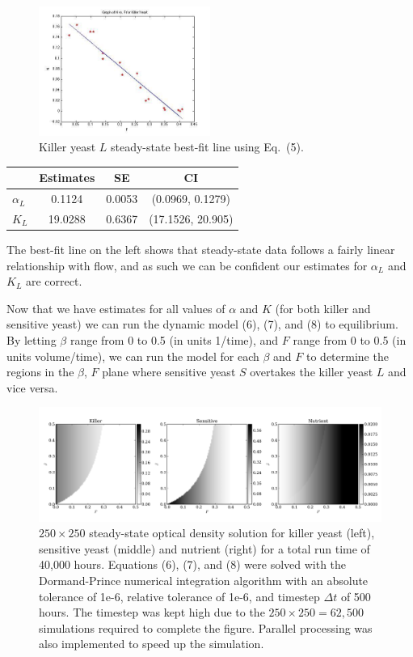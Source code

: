 \begin{multicols}{2}
\begin{figure}[H]
  \centering
    \includegraphics[width=0.5\textwidth]{images/killerFit.jpg}
  \caption{\footnotesize Killer yeast $L$ steady-state best-fit line using Eq.\ (5).}
\end{figure}
\begin{center}
\begin{tabular}{l | c c c}
  & Estimates & SE & CI \\ 
  \hline
  $\alpha_L$ & 0.1124  & 0.0053 & (0.0969,  0.1279) \\
  $K_L$      & 19.0288 & 0.6367 & (17.1526, 20.905) \\
\end{tabular}
\end{center}
The best-fit line on the left shows that steady-state data follows a fairly linear relationship with flow, and as such we can be confident our estimates for $\alpha_L$ and $K_L$ are correct.
\end{multicols}

Now that we have estimates for all values of $\alpha$ and $K$ (for both killer and sensitive yeast) we can run the dynamic model (6), (7), and (8) to equilibrium.  By letting $\beta$ range from 0 to 0.5 (in units 1/time), and $F$ range from 0 to 0.5 (in units volume/time), we can run the model for each $\beta$ and $F$ to determine the regions in the $\beta$, $F$ plane where sensitive yeast $S$ overtakes the killer yeast $L$ and vice versa.
\begin{figure}[H]
  \centering
    \includegraphics[width=1.0\textwidth]{images/sols.png}
  \caption{\footnotesize $250 \times 250$ steady-state optical density solution for killer yeast (left), sensitive yeast (middle) and nutrient (right) for a total run time of 40,000 hours.  Equations (6), (7), and (8) were solved with the Dormand-Prince numerical integration algorithm with an absolute tolerance of 1e-6, relative tolerance of 1e-6, and timestep $\Delta t$ of 500 hours.  The timestep was kept high due to the $250 \times 250 = 62,500$ simulations required to complete the figure.  Parallel processing was also implemented to speed up the simulation.}
\end{figure}

